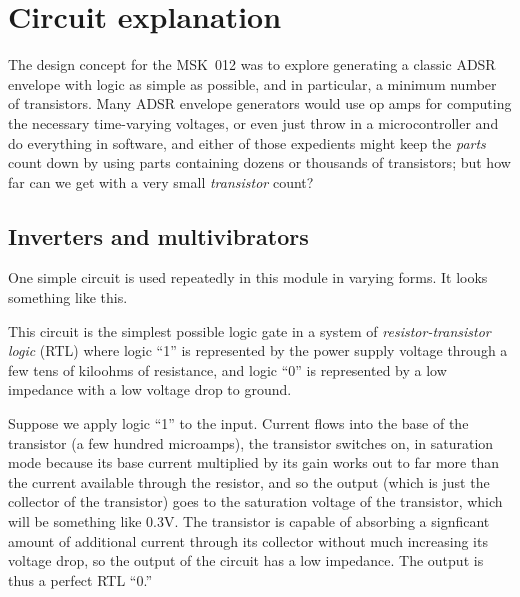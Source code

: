 
%
%
%
%
%
%

\chapter{Circuit explanation}

The design concept for the MSK~012 was to explore generating a classic ADSR
envelope with logic as simple as possible, and in particular, a minimum
number of transistors.  Many ADSR envelope generators would use op amps for
computing the necessary time-varying voltages, or even just throw in a
microcontroller and do everything in software, and either of those
expedients might keep the \emph{parts} count down by using parts containing
dozens or thousands of transistors; but how far can we get with a very small
\emph{transistor} count?

\section{Inverters and multivibrators}

One simple circuit is used repeatedly in this module in varying forms.  It
looks something like this.

{\centering\par}

This circuit is the simplest possible logic gate in a system of
\emph{resistor-transistor logic} (RTL) where logic ``1'' is represented by
the power supply voltage through a few tens of kiloohms of resistance, and
logic ``0'' is represented by a low impedance with a low voltage drop to
ground.

Suppose we apply logic ``1'' to the input.  Current flows into the base of
the transistor (a few hundred microamps), the transistor switches on, in
saturation mode because its base current multiplied by its gain works out to
far more than the current available through the resistor, and so the output
(which is just the collector of the transistor) goes to the saturation
voltage of the transistor, which will be something like 0.3V.  The
transistor is capable of absorbing a signficant amount of additional current
through its collector without much increasing its voltage drop, so the
output of the circuit has a low impedance.  The output is thus a perfect RTL
``0.''

